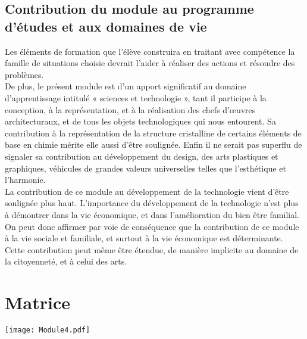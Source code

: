 \subsection{Contribution du module au programme d'études et aux domaines de vie}
Les éléments de formation que l'élève construira en traitant avec compétence la famille de situations choisie devrait l'aider à réaliser des actions et résoudre des problèmes.\\
De plus, le présent module est d'un apport significatif au domaine d'apprentissage intitulé « sciences et technologie », tant il participe à la conception, à la représentation, et à la réalisation des chefs d'œuvres architecturaux, et de tous les objets technologiques qui nous entourent. Sa contribution à la représentation de la structure cristalline de certains éléments de base en chimie mérite elle aussi d'être soulignée. Enfin il ne serait pas superflu de signaler sa contribution au développement du design, des arts plastiques et graphiques, véhicules de grandes valeurs universelles telles que l'esthétique et l'harmonie.\\
La contribution de ce module au développement de la technologie vient d'être soulignée plus haut. L'importance du développement de la technologie n'est plus
à démontrer dans la vie économique, et dans l'amélioration du bien être familial. On peut donc affirmer par voie de conséquence que la contribution de ce module à la vie sociale et familiale, et surtout à la vie économique est déterminante. Cette contribution peut même être étendue, de manière implicite au domaine de la citoyenneté, et à celui des arts.

\section{Matrice}

\texttt{[image: Module4.pdf]} 

\subsection*{}

